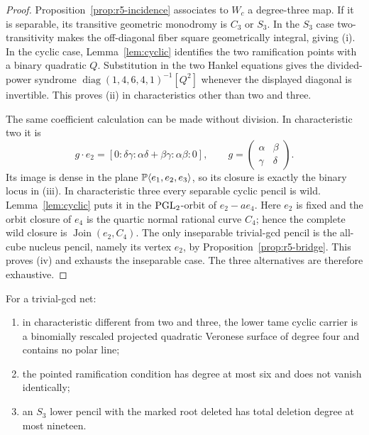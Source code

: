 \begin{proof}
Proposition~\ref{prop:r5-incidence} associates to \(W_c\) a degree-three
map.  If it is separable, its transitive geometric monodromy is
\(C_3\) or \(S_3\).  In the \(S_3\) case two-transitivity makes the
off-diagonal fiber square geometrically integral, giving (i).
In the cyclic case, Lemma~\ref{lem:cyclic} identifies the two
ramification points with a binary quadratic \(Q\).  Substitution in the
two Hankel equations gives the divided-power syndrome
\(\operatorname{diag}(1,4,6,4,1)^{-1}[Q^2]\) whenever the displayed
diagonal is invertible.  This proves (ii) in characteristics other than
two and three.

The same coefficient calculation can be made without division.  In
characteristic two it is
\[
 g\cdot e_2=
 [0:\delta\gamma:\alpha\delta+\beta\gamma:\alpha\beta:0],
 \qquad
 g=\begin{pmatrix}\alpha&\beta\\ \gamma&\delta\end{pmatrix}.
\]
Its image is dense in the plane
\(\mathbb P\langle e_1,e_2,e_3\rangle\), so its closure is exactly the
binary locus in (iii).  In characteristic three every separable
cyclic pencil is wild.  Lemma~\ref{lem:cyclic} puts it in the
\(\operatorname{PGL}_2\)-orbit of \(e_2-ae_4\).  Here \(e_2\) is fixed and the orbit
closure of \(e_4\) is the quartic normal rational curve \(C_4\);
hence the complete wild closure is
\(\operatorname{Join}(e_2,C_4)\).  The only inseparable trivial-gcd
pencil is the all-cube nucleus pencil, namely its vertex \(e_2\), by
Proposition~\ref{prop:r5-bridge}.  This proves (iv) and exhausts the
inseparable case.  The three alternatives are therefore exhaustive.
\end{proof}

\begin{proposition}\label{prop:r6-degrees}%
%
For a trivial-gcd net:
\begin{enumerate}[label=\textup{(\roman*)}]
\item in characteristic different from two and three, the lower tame cyclic
carrier is a binomially rescaled projected quadratic Veronese surface
of degree four and
contains no polar line;
\item the pointed ramification condition has degree at most six and
does not vanish identically;
\item an $S_3$ lower pencil with the marked root deleted has total
deletion degree at most nineteen.
\end{enumerate}
\end{proposition}

